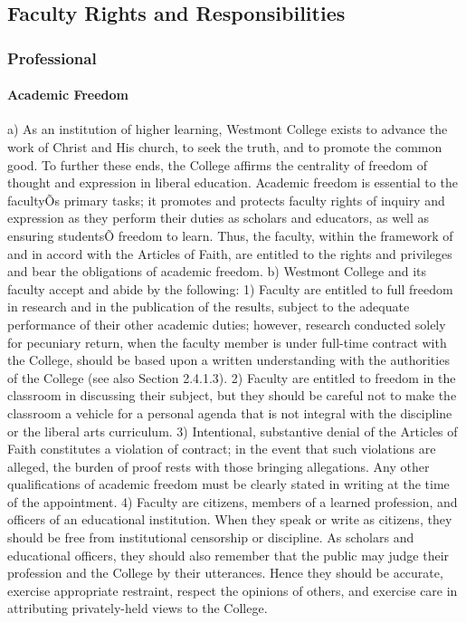 \documentclass[letterpaper, 11pt]{article}
\begin{document}
	\subsection{Faculty Rights and Responsibilities}
		\subsubsection{Professional}
			\paragraph{Academic Freedom}
				a) As an institution of higher learning, Westmont College exists to advance the work of Christ and His church, to seek the truth, and to promote the common good.  To further these ends, the College affirms the centrality of freedom of thought and expression in liberal education.  Academic freedom is essential to the facultyÕs primary tasks; it promotes and protects faculty rights of inquiry and expression as they perform their duties as scholars and educators, as well as ensuring studentsÕ freedom to learn.  Thus, the faculty, within the framework of and in accord with the Articles of Faith, are entitled to the rights and privileges and bear the obligations of academic freedom.
				b) Westmont College and its faculty accept and abide by the following:
				1) Faculty are entitled to full freedom in research and in the publication of the results, subject to the adequate performance of their other academic duties; however, research conducted solely for pecuniary return, when the faculty member is under full-time contract with the College, should be based upon a written understanding with the authorities of the College (see also Section 2.4.1.3).
				2) Faculty are entitled to freedom in the classroom in discussing their subject, but they should be careful not to make the classroom a vehicle for a personal agenda that is not integral with the discipline or the liberal arts curriculum.
				3) Intentional, substantive denial of the Articles of Faith constitutes a violation of contract; in the event that such violations are alleged, the burden of proof rests with those bringing allegations.  Any other qualifications of academic freedom must be clearly stated in writing at the time of the appointment.
				4) Faculty are citizens, members of a learned profession, and officers of an educational institution.  When they speak or write as citizens, they should be free from institutional censorship or discipline.  As scholars and educational officers, they should also remember that the public may judge their profession and the College by their utterances.  Hence they should be accurate, exercise appropriate restraint, respect the opinions of others, and exercise care in attributing privately-held views to the College.
\end{document}
